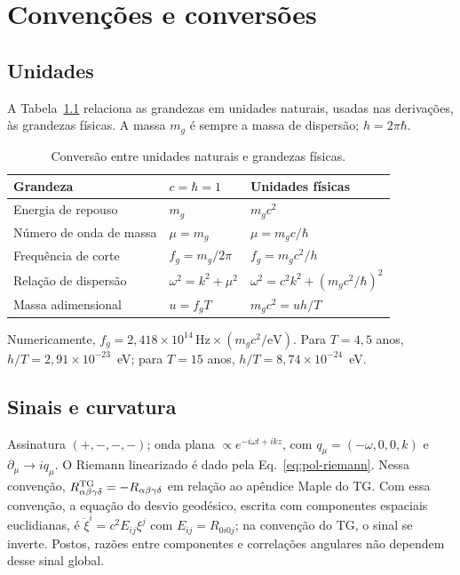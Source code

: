 \chapter{Convenções e conversões}
\label{ap:convencoes}

\section{Unidades}

A Tabela~\ref{tab:ap-unidades} relaciona as grandezas em unidades
naturais, usadas nas derivações, às grandezas físicas. A massa $m_g$ é
sempre a massa de dispersão; $h=2\pi\hbar$.

\begin{table}[htbp]
\centering
\caption{Conversão entre unidades naturais e grandezas físicas.}
\label{tab:ap-unidades}
\small
\begin{tabular}{lll}
\toprule
Grandeza & $c=\hbar=1$ & Unidades físicas\\
\midrule
Energia de repouso & $m_g$ & $m_gc^2$\\
Número de onda de massa & $\mu=m_g$ & $\mu=m_gc/\hbar$\\
Frequência de corte & $f_g=m_g/2\pi$ & $f_g=m_gc^2/h$\\
Relação de dispersão & $\omega^2=k^2+\mu^2$ & $\omega^2=c^2k^2+(m_gc^2/\hbar)^2$\\
Massa adimensional & $u=f_gT$ & $m_gc^2=uh/T$\\
\bottomrule
\end{tabular}
\end{table}

Numericamente, $f_g=2{,}418\times10^{14}\,\mathrm{Hz}\times
(m_gc^2/\mathrm{eV})$. Para $T=4{,}5$ anos, $h/T=2{,}91\times10^{-23}$~eV;
para $T=15$ anos, $h/T=8{,}74\times10^{-24}$~eV.

\section{Sinais e curvatura}

Assinatura $(+,-,-,-)$; onda plana $\propto e^{-i\omega t+ikz}$, com
$q_\mu=(-\omega,0,0,k)$ e $\partial_\mu\to iq_\mu$. O Riemann linearizado é
dado pela Eq.~\eqref{eq:pol-riemann}. Nessa convenção,
$R^{\rm TG}_{\alpha\beta\gamma\delta}=-R_{\alpha\beta\gamma\delta}$ em
relação ao apêndice Maple do TG. Com essa convenção, a equação do
desvio geodésico, escrita com componentes espaciais euclidianas, é
$\ddot\xi^i=c^2E_{ij}\xi^j$ com $E_{ij}=R_{0i0j}$; na convenção do TG, o
sinal se inverte. Postos, razões entre componentes e correlações
angulares não dependem desse sinal global.

